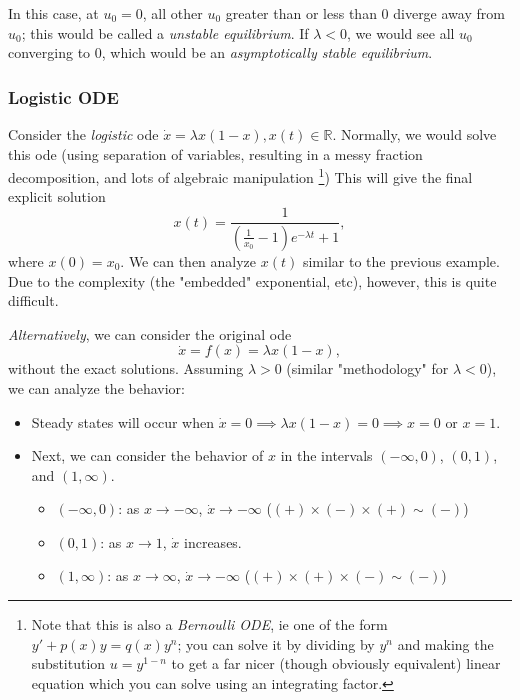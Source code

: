 \documentclass[12pt, oneside]{article}
\begin{document}
In this case, at $u_0 = 0$, all other $u_0$ greater than or less than $0$ diverge away from $u_0$; this would be called a \textit{unstable equilibrium}. If $\lambda < 0$, we would see all $u_0$ converging to $0$, which would be an \textit{asymptotically stable equilibrium}.

\subsubsection{Logistic ODE}

Consider the \textit{logistic} ode $\dot{x} = \lambda x (1-x), x(t) \in \mathbb{R}$. Normally, we would solve this ode (using separation of variables, resulting in a messy fraction decomposition, and lots of algebraic manipulation \footnote{Note that this is also a \emph{Bernoulli ODE}, ie one of the form $y' +p(x)y = q(x)y^n$; you can solve it by dividing by $y^n$ and making the substitution $u = y^{1-n}$ to get a far nicer (though obviously equivalent) linear equation which you can solve using an integrating factor.}) This will give the final explicit solution \[x(t) = \frac{1}{(\frac{1}{x_0}-1)e^{-\lambda t} + 1},\] where $x(0) = x_0$. We can then analyze $x(t)$ similar to the previous example. Due to the complexity (the "embedded" exponential, etc), however, this is quite difficult.

\textit{Alternatively}, we can consider the original ode \[\dot{x} = f(x) = \lambda x (1-x),\] without the exact solutions. Assuming $\lambda > 0$ (similar "methodology" for $\lambda < 0$), we can analyze the behavior:

\begin{itemize}
  \item Steady states will occur when $\dot{x} = 0 \implies  \lambda x (1-x) = 0  \implies x = 0 \text{ or } x = 1$.
  \item Next, we can consider the behavior of $x$ in the intervals $(-\infty, 0)$, $(0, 1)$, and $(1, \infty)$.
  \begin{itemize}
    \item $(-\infty, 0)$: as $x \to - \infty$, $\dot{x} \to -\infty$ ($(+) \times (-) \times (+) \sim (-) $)
    \item $(0, 1)$: as $x \to 1$, $\dot{x}$ increases.
    \item $(1, \infty)$: as $x \to \infty$, $\dot{x} \to -\infty$ ($(+) \times (+) \times (-) \sim (-) $)
  \end{itemize}
\end{itemize}
\end{document}
